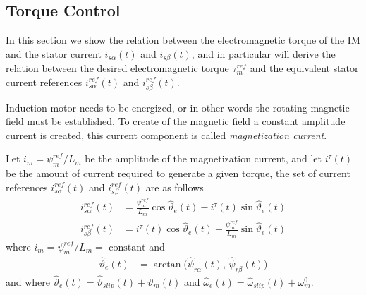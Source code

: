 \documentclass[11pt,a4paper,oneside]{book}
\numberwithin{equation}{section}
\theoremstyle{it}
\theoremstyle{definition}
\begin{document}
\subsection{Torque Control}
In this section we show the relation between the electromagnetic torque of the 
IM and the stator current $i_{s\alpha}(t)$ and $i_{s\beta}(t)$, and in 
particular will derive the relation between the desired electromagnetic torque 
$\tau_m^{ref}$ and the equivalent stator current references 
$i_{s\alpha}^{ref}(t)$ and $i_{s\beta}^{ref}(t)$.

Induction motor needs to be energized, or in other words the rotating magnetic field must be established. To create of the magnetic field a constant amplitude current is created, this current component is called \textit{magnetization current}. 

Let $i_m = \psi_m^{ref}/L_m$ be the amplitude of the magnetization current, and let 
$i^{\tau}(t)$ be the amount of current required to generate a given torque, the 
set of current references $i_{s\alpha}^{ref}(t)$ and $i_{s\beta}^{ref}(t)$ are 
as follows
\begin{equation}\label{im_control_problem_eq_14}
	\begin{aligned}
		i_{s\alpha}^{ref}(t) &= 
		\frac{\psi_m^{ref}}{L_m}\cos\hat{\vartheta}_{e}(t)-i^{\tau}(t)\sin\hat{\vartheta}_{e}(t)
		\\[6pt]
		i_{s\beta}^{ref}(t) &= 
		i^{\tau}(t)\cos\hat{\vartheta}_{e}(t)+\frac{\psi_m^{ref}}{L_m}\sin\hat{\vartheta}_{e}(t)
	\end{aligned}
\end{equation}
where $i_m = \psi_m^{ref}/L_m=\text{ constant}$ and 
\begin{equation}\label{im_control_problem_eq_15}
	\begin{aligned}
		\hat{\vartheta}_{e}(t) &= 
		\arctan\Big(\hat{\psi}_{r\alpha}(t),\,\hat{\psi}_{r\beta}(t)\Big) 
	\end{aligned}
\end{equation}
and where 	$\hat{\vartheta}_{e}(t) = \hat{\vartheta}_{slip}(t)+\vartheta_{m}(t)$ 
and $\hat{\omega}_{e}(t) = \hat{\omega}_{slip}(t)+\omega_{m}^0$. 
\end{document}
